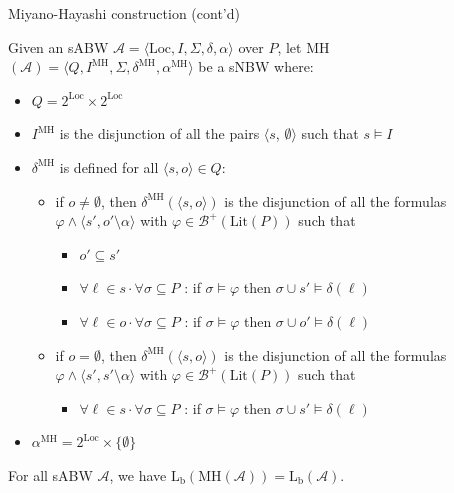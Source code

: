 \documentclass[12pt]{beamer}
\begin{document}
\begin{frame}{Miyano-Hayashi construction (cont'd)}
	
		Given an sABW $\mathcal{A} = \langle \text{Loc}, I, \Sigma, \delta, \alpha \rangle$ over $P$, let MH$(\mathcal{A}) = \langle Q, I^{\text{MH}}, \Sigma, \delta^{\text{MH}}, \alpha^{\text{MH}} \rangle$ be a sNBW where:
		\begin{itemize}
			\item $Q = 2^{\text{Loc}} \times 2^{\text{Loc}}$
			\item $I^{\text{MH}}$ is the disjunction of all the pairs $\langle s$, $\emptyset \rangle$ such that $s \models I$
		
		\item $\delta^{\text{MH}}$ is defined for all $\langle s, o \rangle \in Q$:
		\begin{itemize}
			\item if $o \neq \emptyset$, then $\delta^{\text{MH}}(\langle s, o \rangle)$ is the disjunction of all the formulas $\varphi \land \langle s', o' \setminus \alpha \rangle$ with $\varphi \in \mathcal{B}^{+}(\text{Lit}(P))$ such that
			\begin{itemize}
				\item $o' \subseteq s'$
				\item $\forall \ell \in s \cdot \forall \sigma \subseteq P$ : if $\sigma \models \varphi$ then $\sigma \cup s' \models \delta(\ell)$
				\item $\forall \ell \in o \cdot \forall \sigma \subseteq P$ : if $\sigma \models \varphi$ then $\sigma \cup o' \models \delta(\ell)$
			\end{itemize}
			
			\item if $o = \emptyset$, then $\delta^{\text{MH}}(\langle s, o \rangle)$ is the disjunction of all the formulas $\varphi \land \langle s', s' \setminus \alpha \rangle$ with $\varphi \in \mathcal{B}^{+}(\text{Lit}(P))$ such that
			\begin{itemize}
				\item $\forall \ell \in s \cdot \forall \sigma \subseteq P$ : if $\sigma \models \varphi$ then $\sigma \cup s' \models \delta(\ell)$
			\end{itemize}
		\end{itemize}
		\item $\alpha^{\text{MH}} = 2^{\text{Loc}} \times \{\emptyset\}$
		\end{itemize}
	\begin{theorem}
		For all sABW $\mathcal{A}$, we have $\text{L}_{\text{b}}(\text{MH}(\mathcal{A})) = \text{L}_{\text{b}}(\mathcal{A})$.
	\end{theorem}
\end{frame}
\end{document}
